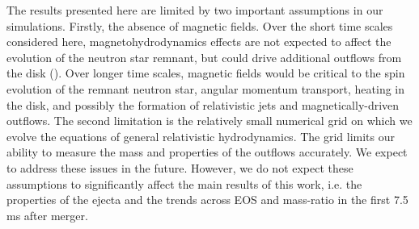 

The results presented here are limited by two important assumptions in our simulations. Firstly, the absence of magnetic fields. Over the short time scales considered here, magnetohydrodynamics effects are not expected to affect the evolution of the neutron star remnant, but could drive additional outflows from the disk (\citet*{kiuchi2014,neilsen2014magnetized}). Over longer time scales, magnetic fields would be critical to the spin evolution of the remnant neutron star, angular momentum transport, heating in the disk, and possibly the formation of relativistic jets and magnetically-driven outflows. The second limitation is the relatively small numerical grid on which we evolve the equations of general relativistic hydrodynamics. The grid limits our ability to measure the mass and properties of the outflows accurately. We expect to address these issues in the future. However, we do not expect these assumptions to significantly affect the main results of this work, i.e. the properties of the ejecta and the trends across EOS and mass-ratio in the first 7.5 ms after merger.


